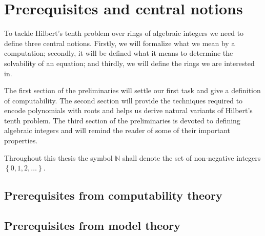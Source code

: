 \documentclass[12pt, a4paper, numbers=noenddot]{scrbook}
\numberwithin{equation}{section}
\newcommand{\set}[1]{\left\lbrace #1 \right\rbrace}
\begin{document}


\allowdisplaybreaks

\frontmatter



\mainmatter

\chapter{Prerequisites and central notions}

To tackle Hilbert's tenth problem over rings of algebraic integers we need
to define three central notions. Firstly, we will formalize what we mean by a
computation; secondly, it will be defined what it means to determine the
solvability of an equation; and thirdly, we will define the rings we are
interested in.

The first section of the preliminaries will settle our first task and give a
definition of computability. The second section will provide the techniques
required to encode polynomials with roots and helps us derive natural variants
of Hilbert's tenth problem. The third section of the preliminaries is devoted to
defining algebraic integers and will remind the reader of some of their
important properties.

Throughout this thesis the symbol \(ℕ\) shall denote the set of non-negative
integers \(\set{0, 1, 2, …}\).

\section{Prerequisites from computability theory}%
\label{sec:computability theory}


\section{Prerequisites from model theory}\label{sec:model theory}

\end{document}

